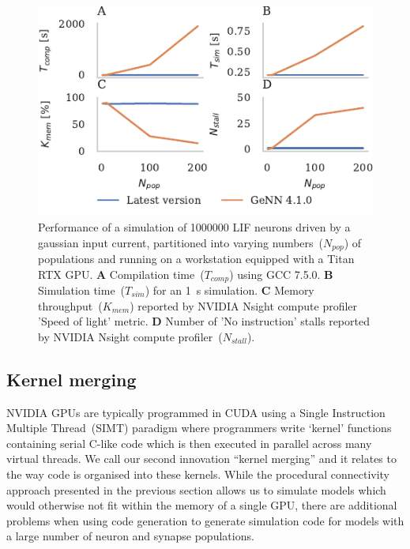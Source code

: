 \documentclass[9pt,twocolumn,twoside,lineno]{pnas-new}
\begin{document}
\begin{figure}
    \centering
    \includegraphics{figures/merging_scaling}
    \caption{Performance of a simulation of \num{1000000} LIF neurons driven by a gaussian input current, partitioned into varying numbers~($N_{pop}$) of populations and running on a workstation equipped with a Titan RTX GPU.
    \textbf{A} Compilation time~($T_{comp}$) using GCC 7.5.0.
    \textbf{B} Simulation time~($T_{sim}$) for an \SI{1}{\second} simulation.
    \textbf{C} Memory throughput~($K_{mem}$) reported by NVIDIA Nsight compute profiler 'Speed of light' metric.
    \textbf{D} Number of 'No instruction' stalls reported by NVIDIA Nsight compute profiler~($N_{stall}$).}
    \label{fig:merging_scaling}
\end{figure}

\subsection*{Kernel merging}
NVIDIA GPUs are typically programmed in CUDA using a Single Instruction Multiple Thread~(SIMT) paradigm where programmers write `kernel' functions containing serial C-like code which is then executed in parallel across many virtual threads.
We call our second innovation ``kernel merging'' and it relates to the way code is organised into these kernels.
While the procedural connectivity approach presented in the previous section allows us to simulate models which would otherwise not fit within the memory of a single GPU, there are additional problems when using code generation to generate simulation code for models with a large number of neuron and synapse populations.
\end{document}
